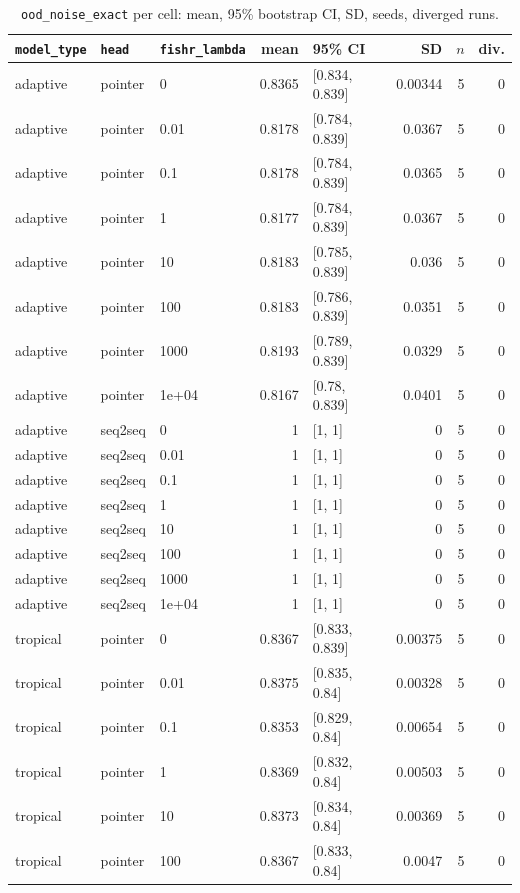 \documentclass[10pt]{article}
\begin{document}
{\small
\begin{longtable}{lllrlrrr}
\caption{\texttt{ood\_noise\_exact} per cell: mean, 95\% bootstrap CI, SD, seeds, diverged runs.}\label{tab:summary-ood_noise_exact}\\
\toprule
\texttt{model\_type} & \texttt{head} & \texttt{fishr\_lambda} & mean & 95\% CI & SD & $n$ & div.\\
\midrule
\endhead
adaptive & pointer & 0 & 0.8365 & [0.834, 0.839] & 0.00344 & 5 & 0\\
adaptive & pointer & 0.01 & 0.8178 & [0.784, 0.839] & 0.0367 & 5 & 0\\
adaptive & pointer & 0.1 & 0.8178 & [0.784, 0.839] & 0.0365 & 5 & 0\\
adaptive & pointer & 1 & 0.8177 & [0.784, 0.839] & 0.0367 & 5 & 0\\
adaptive & pointer & 10 & 0.8183 & [0.785, 0.839] & 0.036 & 5 & 0\\
adaptive & pointer & 100 & 0.8183 & [0.786, 0.839] & 0.0351 & 5 & 0\\
adaptive & pointer & 1000 & 0.8193 & [0.789, 0.839] & 0.0329 & 5 & 0\\
adaptive & pointer & 1e+04 & 0.8167 & [0.78, 0.839] & 0.0401 & 5 & 0\\
adaptive & seq2seq & 0 & 1 & [1, 1] & 0 & 5 & 0\\
adaptive & seq2seq & 0.01 & 1 & [1, 1] & 0 & 5 & 0\\
adaptive & seq2seq & 0.1 & 1 & [1, 1] & 0 & 5 & 0\\
adaptive & seq2seq & 1 & 1 & [1, 1] & 0 & 5 & 0\\
adaptive & seq2seq & 10 & 1 & [1, 1] & 0 & 5 & 0\\
adaptive & seq2seq & 100 & 1 & [1, 1] & 0 & 5 & 0\\
adaptive & seq2seq & 1000 & 1 & [1, 1] & 0 & 5 & 0\\
adaptive & seq2seq & 1e+04 & 1 & [1, 1] & 0 & 5 & 0\\
tropical & pointer & 0 & 0.8367 & [0.833, 0.839] & 0.00375 & 5 & 0\\
tropical & pointer & 0.01 & 0.8375 & [0.835, 0.84] & 0.00328 & 5 & 0\\
tropical & pointer & 0.1 & 0.8353 & [0.829, 0.84] & 0.00654 & 5 & 0\\
tropical & pointer & 1 & 0.8369 & [0.832, 0.84] & 0.00503 & 5 & 0\\
tropical & pointer & 10 & 0.8373 & [0.834, 0.84] & 0.00369 & 5 & 0\\
tropical & pointer & 100 & 0.8367 & [0.833, 0.84] & 0.0047 & 5 & 0\\

\end{longtable}}
\end{document}
